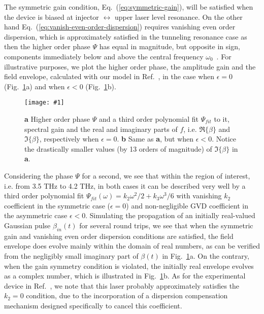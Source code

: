 \documentclass[onecolumn,secnumarabic,amssymb, nobibnotes, aip, prd]{revtex4-1}
\newcommand{\includegraphicsXL}[1]{\texttt{[image: \#1]}}
\begin{document}
The symmetric gain condition, Eq.~(\ref{eq:symmetric-gain}), will be satisfied when the device is biased at injector $\leftrightarrow$ upper laser level resonance. On the other hand Eq.~(\ref{eq:vanish-even-order-dispersion}) requires vanishing even order dispersion, which is approximately satisfied in the tunneling resonance case as then the higher order phase $\Psi$ has equal in magnitude, but opposite in sign, components immediately below and above the central frequency $\omega_0$~\cite{khurgin2005optical}. For illustrative purposes, we plot the higher order phase, the amplitude gain and the field envelope, calculated with our model in Ref.~, in the case when $\epsilon = 0$ (Fig.~\ref{fig:dispersion-on-off-resonance}a) and when $\epsilon < 0$ (Fig.~\ref{fig:dispersion-on-off-resonance}b). 
\begin{figure}[h!]
	\begin{center}
		\includegraphicsXL{IMGS/dispersion-on-off-resonance.eps}
		\caption{ \textbf{a} Higher order phase $\Psi$ and a third order polynomial fit $\Psi_{fit}$ to it, spectral gain  and the real and imaginary parts of $f$, i.e. $\Re\{\beta\}$ and $\Im\{\beta\}$, respectively when $\epsilon = 0$. \textbf{b} Same as \textbf{a}, but when $\epsilon <0$. Notice the drastically smaller values (by 13 orders of magnitude) of $\Im\{\beta\}$ in \textbf{a}. } \label{fig:dispersion-on-off-resonance}
	\end{center}	
\end{figure}
Considering the phase $\Psi$ for a second, we see that within the region of interest, i.e. from 3.5 THz to 4.2 THz, in both cases it can be described very well by a third order polynomial fit $\Psi_{fit}(\omega) = k_2\omega^2/2 + k_3\omega^3/6$ with vanishing $k_2$ coefficient in the symmetric case ($\epsilon = 0$) and non-negligible GVD coefficient in the asymmetric case $\epsilon <0$. Simulating the propagation of an initially real-valued Gaussian pulse $\beta_{in}(t)$ for several round trips, we see that when the symmetric gain and vanishing even order dispersion conditions are satisfied, the field envelope does evolve mainly within the domain of real numbers, as can be verified from the negligibly small imaginary part of $\beta(t)$ in Fig.~\ref{fig:dispersion-on-off-resonance}a. On the contrary, when the gain symmetry condition is violated, the initially real envelope evolves as a complex number, which is illustrated in Fig.~\ref{fig:dispersion-on-off-resonance}b. As for the experimental device in Ref.~, we note that this laser probably approximately satisfies the $k_2 = 0$ condition, due to the incorporation of a dispersion compensation mechanism designed specifically to cancel this coefficient. 
\end{document}
